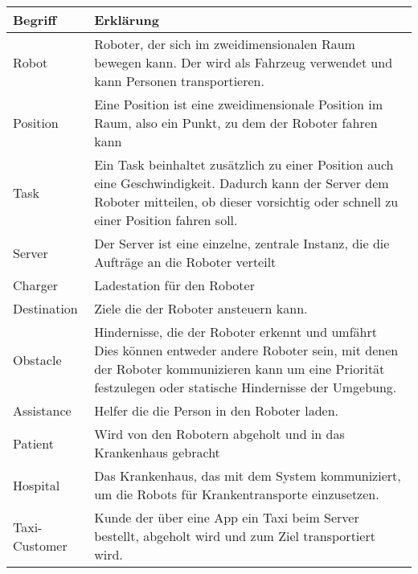 	\begin{tabularx}{\textwidth}{|l|X|}
		\hline
		\textbf{Begriff} & \textbf{Erklärung}\\ \hline
		Robot & Roboter, der sich im zweidimensionalen Raum bewegen kann. Der wird
		als Fahrzeug verwendet und kann Personen transportieren.\\ \hline
		Position & Eine Position ist eine zweidimensionale Position im Raum,
		also ein Punkt, zu dem der Roboter fahren kann\\ \hline
		Task & Ein Task beinhaltet zusätzlich zu einer Position auch eine
		Geschwindigkeit. Dadurch kann der Server dem Roboter mitteilen, ob
		dieser vorsichtig oder schnell zu einer Position fahren
		soll.\\ \hline
		Server & Der Server ist eine einzelne, zentrale Instanz, die die Aufträge
		an die Roboter verteilt\\ \hline
		Charger & Ladestation für den Roboter\\ \hline
		Destination & Ziele die der Roboter ansteuern kann.\\ \hline
		Obstacle & Hindernisse, die der Roboter erkennt und umfährt Dies können
		entweder andere Roboter sein, mit denen der Roboter kommunizieren kann
		um eine Priorität festzulegen oder statische Hindernisse der
		Umgebung.\\ \hline
		Assistance & Helfer die die Person in den Roboter laden.\\ \hline
		Patient & Wird von den Robotern abgeholt und in das Krankenhaus gebracht\\ \hline
		Hospital & Das Krankenhaus, das mit dem System kommuniziert, um die Robots für Krankentransporte einzusetzen. \\ \hline
		Taxi-Customer & Kunde der über eine App ein Taxi beim Server bestellt, abgeholt wird und zum Ziel transportiert wird.\\ \hline
	\end{tabularx}
